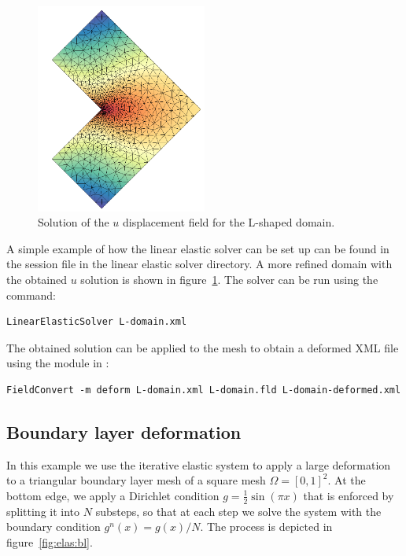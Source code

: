 \begin{figure}
  \begin{center}
    \includegraphics[width=0.5\textwidth]{img/l-shape}
  \end{center}
  \caption{Solution of the $u$ displacement field for the L-shaped domain.}
  \label{fig:elas:ldomain}
\end{figure}

A simple example of how the linear elastic solver can be set up can be found in
the  session file in the linear elastic solver
directory. A more refined domain with the obtained $u$ solution is shown in
figure~\ref{fig:elas:ldomain}. The solver can be run using the command:

\begin{lstlisting}[style=BashInputStyle]
  LinearElasticSolver L-domain.xml
\end{lstlisting}

The obtained solution  can be applied to the mesh to obtain
a deformed XML file using the  module in :

\begin{lstlisting}[style=BashInputStyle]
  FieldConvert -m deform L-domain.xml L-domain.fld L-domain-deformed.xml
\end{lstlisting}

\subsection{Boundary layer deformation}

In this example we use the iterative elastic system to apply a large deformation
to a triangular boundary layer mesh of a square mesh $\Omega = [0,1]^2$. At the
bottom edge, we apply a Dirichlet condition $g=\tfrac{1}{2}\sin(\pi x)$ that is
enforced by splitting it into $N$ substeps, so that at each step we solve the
system with the boundary condition $g^n(x) = g(x)/N$. The process is depicted in
figure~\ref{fig:elas:bl}.


